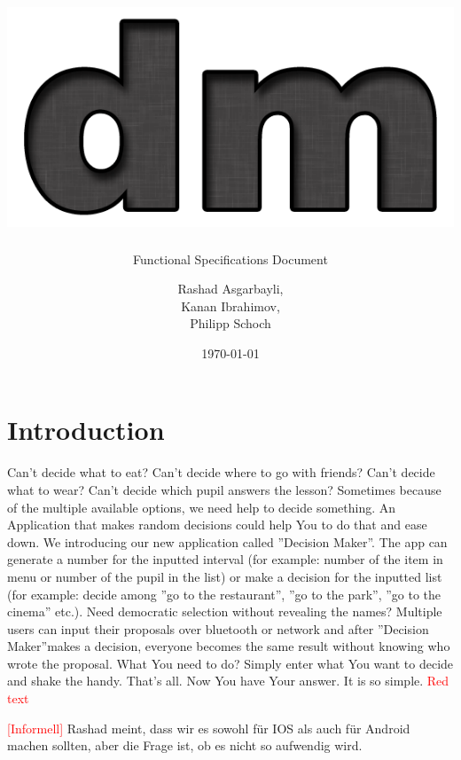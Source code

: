 \documentclass[hidelinks, a4paper, 11pt]{scrartcl}
\author{Rashad Asgarbayli,\\ Kanan Ibrahimov,\\ Philipp Schoch}
\title{\vspace{3cm}\includegraphics[scale=0.7]{Logo.png}\\ \app\vspace{20mm}}
\subtitle{Functional Specifications Document}
\date{\today}
\def\app{''Decision Maker''}
\def\com #1{\textcolor{red}{#1}}
\begin{document}
\maketitle
\thispagestyle{empty}

\newpage

\tableofcontents

\newpage


\section{Introduction}

\paragraph{}Can't decide what to eat? Can't decide where to go with friends? Can't decide what to wear? Can't decide which pupil answers the lesson? Sometimes because of the multiple available options, we need help to decide something. An Application that makes random decisions could help You to do that and ease down. We introducing our new application called \app. The app can generate a number for the inputted interval (for example: number of the item in menu or number of the pupil in the list) or make a decision for the inputted list (for example: decide among ''go to the restaurant'', ''go to the park'', ''go to the cinema'' etc.). Need democratic selection without revealing the names? Multiple users can input their proposals over bluetooth or network and after \app makes a decision, everyone becomes the same result without knowing who wrote the proposal. What You need to do? Simply enter what You want to decide and shake the handy. That's all. Now You have Your answer. It is so simple.
\com{Red text}







\textcolor{red}{[Informell]} Rashad meint, dass wir es sowohl für IOS als auch für Android machen sollten, aber die Frage ist, ob es nicht so aufwendig wird. 

















\end{document}
